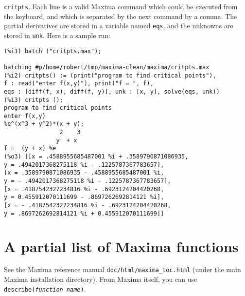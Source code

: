 \documentclass[a4paper,12pt]{article}
\begin{document}
{\tt critpts}. Each line is a valid Maxima command which could be
executed from the keyboard, and which is separated by the next command
by a comma.  The partial derivatives are stored in a variable named
{\tt eqs}, and the unknowns are stored in {\tt unk}.  Here is a sample
run:
\begin{verbatim} 
(%i1) batch ("critpts.max");

batching #p/home/robert/tmp/maxima-clean/maxima/critpts.max
(%i2) critpts() := (print("program to find critical points"), 
f : read("enter f(x,y)"), print("f = ", f), 
eqs : [diff(f, x), diff(f, y)], unk : [x, y], solve(eqs, unk))
(%i3) critpts ();
program to find critical points 
enter f(x,y) 
%e^(x^3 + y^2)*(x + y);
                2    3
               y  + x
f =  (y + x) %e        
(%o3) [[x = .4588955685487001 %i + .3589790871086935, 
y = .4942017368275118 %i - .1225787367783657], 
[x = .3589790871086935 - .4588955685487001 %i, 
y = - .4942017368275118 %i - .1225787367783657], 
[x = .4187542327234816 %i - .6923124204420268, 
y = 0.455912070111699 - .8697262692814121 %i], 
[x = - .4187542327234816 %i - .6923124204420268, 
y = .8697262692814121 %i + 0.455912070111699]]
\end{verbatim}

\section{A partial list of Maxima functions}

See the Maxima reference manual {\tt doc/html/maxima\_toc.html} (under
the main Maxima installation directory).  From Maxima itself, you can
use {\tt describe(\textit{function name})}.
\end{document}
